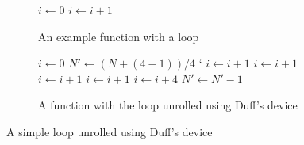 \begin{figure}
    \begin{subfigure}[b]{0.5\textwidth}
        \centering
        \begin{algorithmic}
                \State $i \gets 0$
                    \State {}
                    \State $i \gets i + 1$
                \EndWhile
            \EndFunction
        \end{algorithmic}
        \caption{An example function with a loop}
    \end{subfigure}
    \begin{subfigure}[b]{0.5\textwidth}
        \centering
        \begin{algorithmic}
                \State $i \gets 0$
                \State $N' \gets (N + (4 - 1)) / 4$
`               
                        \State {}
                        \State $i \gets i + 1$ 
                    \EndCase
                        \State {}
                        \State $i \gets i + 1$ 
                    \EndCase
                        \State {}
                        \State $i \gets i + 1$ 
                    \EndCase
                        \State {}
                        \State $i \gets i + 1$
                    \EndCase
                \EndSwitch
                    \State {}
                    \State {}
                    \State {}
                    \State {}
                    \State $i \gets i + 4$
                    \State $N' \gets N' - 1$
                \EndWhile
            \EndFunction
        \end{algorithmic}
        \caption{A function with the loop unrolled using Duff's device}
    \end{subfigure}
    \caption{A simple loop unrolled using Duff's device}
    \label{fig:basics:duff}
\end{figure}
